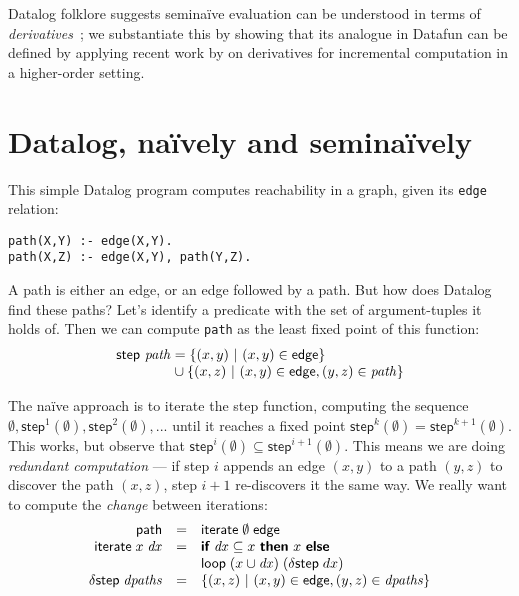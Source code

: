 \documentclass[sigplan,screen,dvipsnames]{acmart}
\newcommand{\naive}{na\"ive}
\newcommand{\setfor}[2]{\{#1 ~|~ #2\}}
\newcommand{\kw}[1]{\textsf{\bfseries #1}}
\newcommand{\tlv}[1]{\textsf{#1}}
\newcommand{\var}[1]{\mathit{#1}}
\newcommand{\dee}[1]{\var{d#1}}
\newcommand{\eif}[2]{\kw{if}~#1~\kw{then}~#2~\kw{else}~}
\begin{document}
Datalog folklore suggests semi\naive{} evaluation can be understood in terms of
\emph{derivatives}~\citep{bancilhon85,bancilhon86}; we substantiate this by
showing that its analogue in Datafun can be defined by applying recent work by
\citet{incremental} on derivatives for incremental computation in a higher-order
setting.


\section{Datalog, \naive{}ly and semi\naive{}ly}\label{sec:datalog}

This simple Datalog program computes reachability in a graph, given its
\texttt{edge} relation:
%
\begin{lstlisting}
path(X,Y) :- edge(X,Y).
path(X,Z) :- edge(X,Y), path(Y,Z).
\end{lstlisting}

A path is either an edge, or an edge followed by a path. But how does Datalog
find these paths? Let's identify a predicate with the set of argument-tuples it
holds of. Then we can compute \texttt{path} as the least fixed point of this
function:
%
\[
\begin{array}{l}
  \tlv{step}~ \var{path} = \setfor{(x,y)}{(x,y) \in \tlv{edge}}\\
  \phantom{\tlv{step}~ \var{path}} \hspace{.5pt}\cup
  \setfor{(x,z)}{(x,y) \in \tlv{edge}, (y,z) \in \var{path}}
\end{array}
\]

The \naive{} approach is to iterate the \tlv{step} function, computing the
sequence $\emptyset, \tlv{step}^1(\emptyset), \tlv{step}^2(\emptyset), ...$
until it reaches a fixed point $\tlv{step}^k(\emptyset) =
\tlv{step}^{k+1}(\emptyset)$.
%
This works, but observe that $\tlv{step}^i(\emptyset) \subseteq
\tlv{step}^{i+1}(\emptyset)$. This means we are doing \emph{redundant
  computation} --- if step $i$ appends an edge $(x,y)$ to a path $(y,z)$ to
discover the path $(x,z)$, step $i+1$ re-discovers it the same way. We really
want to compute the \emph{change} between iterations:
%
\[
\begin{array}{rcl}
  \tlv{path} &=& \tlv{iterate} \;\emptyset \;\tlv{edge}\\
  \tlv{iterate} \;x \;\dee x &=&
  \eif{\dee x \subseteq x}{x}\\
  && \tlv{loop} \;(x \cup \dee x) \;(\delta\tlv{step} \;dx)\\
  \delta\tlv{step} \;\var{dpaths} &=&
  \setfor{(x,z)}{(x,y) \in \tlv{edge}, (y,z) \in \var{dpaths}}\\
\end{array}
\]
\end{document}

